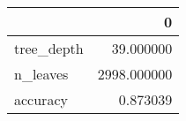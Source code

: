 \begin{tabular}{lr}
\toprule
 & 0 \\
\midrule
tree\_depth & 39.000000 \\
n\_leaves & 2998.000000 \\
accuracy & 0.873039 \\
\bottomrule
\end{tabular}